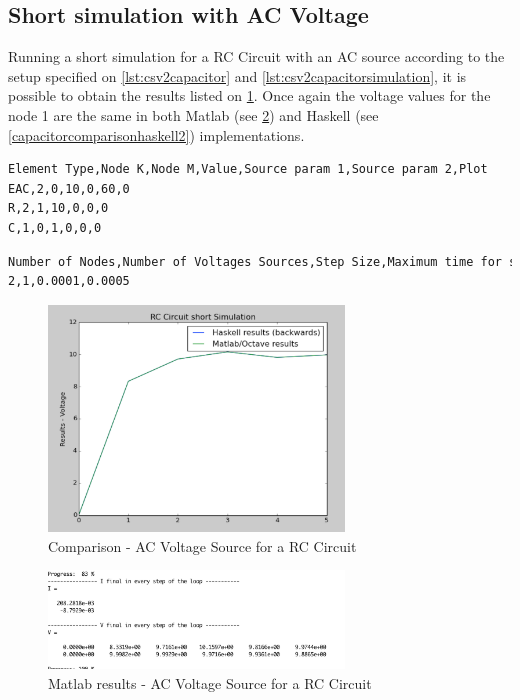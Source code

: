 \subsection{Short simulation with AC Voltage}

Running a short simulation for a RC Circuit with an AC source according to the setup specified on \cref{lst:csv2capacitor} and \cref{lst:csv2capacitorsimulation}, it is possible to obtain the results listed on \cref{capacitorcomparison2}. Once again the voltage values for the node 1 are the same in both Matlab (see \cref{capacitorcomparisonmatlab2}) and Haskell (see \cref{capacitorcomparisonhaskell2}) implementations. 

\begin{lstlisting}[language=bash, label=getinfo, caption={Input data file for components in the Haskell implementation}, captionpos=b, label={lst:csv2capacitor}]
Element Type,Node K,Node M,Value,Source param 1,Source param 2,Plot
EAC,2,0,10,0,60,0
R,2,1,10,0,0,0
C,1,0,1,0,0,0
\end{lstlisting}


\begin{lstlisting}[language=bash, label=getinfo, caption={Input data file for components in the Haskell implementation}, captionpos=b, label={lst:csv2capacitorsimulation}]
Number of Nodes,Number of Voltages Sources,Step Size,Maximum time for simulation
2,1,0.0001,0.0005
\end{lstlisting}

\begin{figure}[H]
   \centering
   \includegraphics[width=0.7\textwidth]{img/capacitorcomparison2.png}
   \caption{Comparison - AC Voltage Source for a RC Circuit}
   \label{capacitorcomparison2}
\end{figure}

\begin{figure}[H]
   \centering
   \includegraphics[width=0.7\textwidth]{img/capacitorcomparisonmatlab2.png}
   \caption{Matlab results - AC Voltage Source for a RC Circuit}
   \label{capacitorcomparisonmatlab2}
\end{figure}


